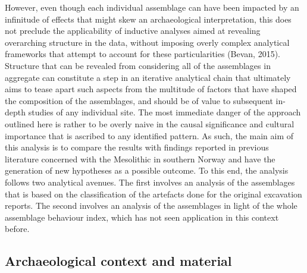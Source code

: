 \documentclass[
]{article}
\begin{document}
However, even though each individual assemblage can have been impacted by an infinitude of effects that might skew an archaeological interpretation, this does not preclude the applicability of inductive analyses aimed at revealing overarching structure in the data, without imposing overly complex analytical frameworks that attempt to account for these particularities (Bevan, 2015). Structure that can be revealed from considering all of the assemblages in aggregate can constitute a step in an iterative analytical chain that ultimately aims to tease apart such aspects from the multitude of factors that have shaped the composition of the assemblages, and should be of value to subsequent in-depth studies of any individual site. The most immediate danger of the approach outlined here is rather to be overly naive in the causal significance and cultural importance that is ascribed to any identified pattern. As such, the main aim of this analysis is to compare the results with findings reported in previous literature concerned with the Mesolithic in southern Norway and have the generation of new hypotheses as a possible outcome. To this end, the analysis follows two analytical avenues. The first involves an analysis of the assemblages that is based on the classification of the artefacts done for the original excavation reports. The second involves an analysis of the assemblages in light of the whole assemblage behaviour index, which has not seen application in this context before.

\hypertarget{archaeological-context-and-material}{%
\subsection{Archaeological context and material}\label{archaeological-context-and-material}}
\end{document}
